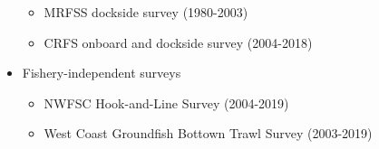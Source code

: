 \documentclass[11pt,
  english,
  a4paper,
]{article}
\begin{document}
\begin{itemize}
\begin{itemize}
    \tagmcend\tagstructend\tagstructend
  \item


    MRFSS dockside survey (1980-2003)

    \tagmcend\tagstructend\tagstructend

    \tagmcend\tagstructend\tagstructend
  \item


    CRFS onboard and dockside survey (2004-2018)

    \tagmcend\tagstructend\tagstructend

    \tagmcend\tagstructend\tagstructend
  \end{itemize}

  \tagstructend
\item

  Fishery-independent surveys

  \tagmcend\tagstructend\tagstructend


  \begin{itemize}
  \item


    NWFSC Hook-and-Line Survey (2004-2019)

    \tagmcend\tagstructend\tagstructend

    \tagmcend\tagstructend\tagstructend
  \item


    West Coast Groundfish Bottown Trawl Survey (2003-2019)

    \tagmcend\tagstructend\tagstructend

    \tagmcend\tagstructend\tagstructend
  \end{itemize}

  \tagstructend
\end{itemize}
\end{document}
